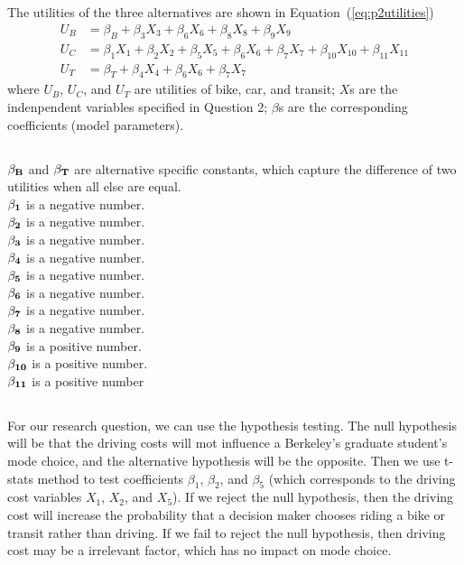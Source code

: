 \documentclass[11pt]{article}
\begin{document}
\subsection{}
The utilities of the three alternatives are shown in Equation~(\ref{eq:p2utilities})
\begin{equation}\label{eq:p2utilities}
\begin{array}{ll}
U_B&=\beta_B+\beta_3X_3+\beta_6X_6+\beta_8X_8+\beta_9X_9\\
U_C&=\beta_1X_1+\beta_2X_2+\beta_5X_5+\beta_6X_6+\beta_7X_7+\beta_{10}X_{10}+\beta_{11}X_{11}\\
U_T&=\beta_T+\beta_4X_4+\beta_6X_6+\beta_7X_7
\end{array}
\end{equation}
where $U_B$, $U_C$, and $U_T$ are utilities of bike, car, and transit; $X$s are the indenpendent variables specified in Question 2; $\beta$s are the corresponding coefficients (model parameters). 
\subsection{}
$\bf{\beta_B}$ and  $\bf{\beta_T}$ are alternative specific constants, which capture the difference of two utilities when all else are equal.\\
$\bf{\beta_1}$ is a negative number.\\
$\bf{\beta_2}$ is a negative number.\\
$\bf{\beta_3}$ is a negative number.\\
$\bf{\beta_4}$ is a negative number.\\
$\bf{\beta_5}$ is a negative number.\\
$\bf{\beta_6}$ is a negative number.\\
$\bf{\beta_7}$ is a negative number.\\
$\bf{\beta_8}$ is a negative number.\\
$\bf{\beta_9}$ is a positive number.\\
$\bf{\beta_{10}}$ is a positive number.\\
$\bf{\beta_{11}}$ is a positive number
\subsection{}
For our research question, we can use the hypothesis testing. The null hypothesis will be that the driving costs will mot influence a Berkeley's graduate student's mode choice, and the alternative hypothesis will be the opposite. Then we use t-stats method to test coefficients $\beta_1$, $\beta_2$, and $\beta_5$ (which corresponds to the driving cost variables $X_1$, $X_2$, and $X_5$). If we reject the null hypothesis, then the driving cost will increase the probability that a decision maker chooses riding a bike or transit rather than driving. If we fail to reject the null hypothesis, then driving cost may be a irrelevant factor, which has no impact on mode choice. 

\end{document}

